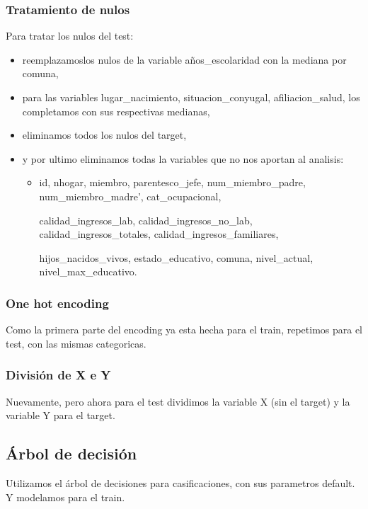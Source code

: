 \documentclass[a4paper]{article}
\begin{document}
            \subsubsection*{Tratamiento de nulos}

            Para tratar los nulos del test:
            \begin{itemize}
                \item reemplazamoslos nulos de la variable años\_escolaridad con la mediana por comuna,
                \item para las variables lugar\_nacimiento, situacion\_conyugal, afiliacion\_salud, los completamos con sus respectivas medianas,
                \item eliminamos todos los nulos del target,
                \item y por ultimo eliminamos todas la variables que no nos aportan al analisis:
                \begin{itemize}
                    \item id, nhogar, miembro, parentesco\_jefe, num\_miembro\_padre, num\_miembro\_madre', cat\_ocupacional,
                    
                    calidad\_ingresos\_lab, calidad\_ingresos\_no\_lab, calidad\_ingresos\_totales, calidad\_ingresos\_familiares, 
                    
                    hijos\_nacidos\_vivos, estado\_educativo, comuna, nivel\_actual, nivel\_max\_educativo.
                \end{itemize}
            \end{itemize}

            \subsubsection*{One hot encoding}

                Como la primera parte del encoding ya esta hecha para el train, repetimos para el test, con las mismas categoricas.
            
            \subsubsection*{División de X e Y}

                Nuevamente, pero ahora para el test dividimos la variable X (sin el target) y la variable Y para el target. 
    \subsection{Árbol de decisión}

        Utilizamos el árbol de decisiones para casificaciones, con sus parametros default. Y modelamos para el train.
\end{document}
